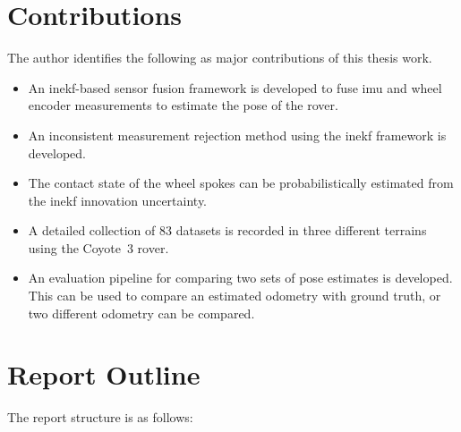 \documentclass[report.tex]{subfiles}
\begin{document}
    \FloatBarrier
    \section{Contributions}
    
    The author identifies the following as major contributions of this thesis work. 
    \begin{itemize}
        \item An \gls{inekf}-based sensor fusion framework is developed to fuse \gls{imu} and wheel encoder measurements to estimate the pose of the rover.
        \item An inconsistent measurement rejection method using the \gls{inekf} framework is developed.
        \item The contact state of the wheel spokes can be probabilistically estimated from the \gls{inekf} innovation uncertainty.
        \item A detailed collection of 83 datasets is recorded in three different terrains using the Coyote~3 rover.
        \item An evaluation pipeline for comparing two sets of pose estimates is developed. This can be used to compare an estimated odometry with ground truth, or two different odometry can be compared.
    \end{itemize} 

    \section{Report Outline}

    The report structure is as follows:
    
\end{document}
